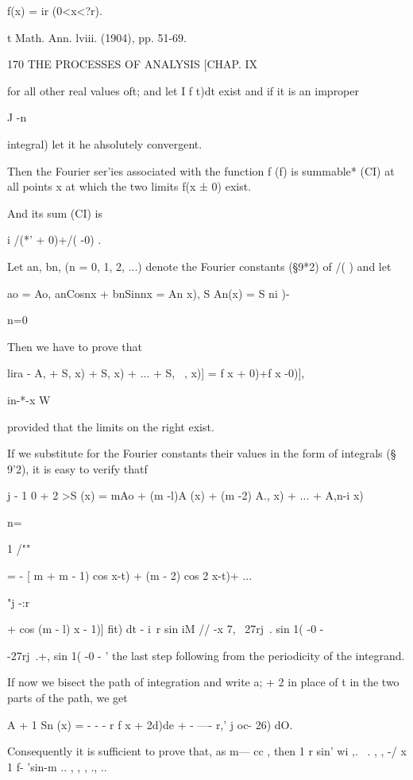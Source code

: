 f(x) = ir (0<x<?r).

t Math. Ann. lviii. (1904), pp. 51-69.



170 THE PROCESSES OF ANALYSIS [CHAP. IX



for all other real values oft; and let I f t)dt exist and if it is an
improper

J -n

integral) let it he ahsolutely convergent.

Then the Fourier ser'ies associated with the function f (f) is
summable* (CI) at all points x at which the two limits f(x ± 0) exist.

And its sum (CI) is

i /(*' + 0)+/( -0) .

Let an, bn, (n = 0, 1, 2, ...) denote the Fourier constants (§9*2) of
/( ) and let

 ao = Ao, anCosnx + bnSinnx = An x), S An(x) = S ni )-



n=0



Then we have to prove that



lira - A, + S, x) + S, x) + ... + S, \ , x)] = f x + 0)+f x -0)],

in-*-x W

provided that the limits on the right exist.

If we substitute for the Fourier constants their values in the form of
integrals (§ 9'2), it is easy to verify thatf

j - 1 0 + 2 >S (x) = mAo + (m -l)A (x) + (m -2) A., x) + ... + A,n-i
x)

n=\

1 /""

= - [ m + m - 1) cos x-t) + (m - 2) cos 2 x-t)+ ...

 "j -:r

+ cos (m - l) x - 1)] fit) dt - i\ r sin iM // -x 7, ~27rj\ . sin 1(
-0 -

-27rj\ .+, sin 1( -0 - ' the last step following from the periodicity
of the integrand.

If now we bisect the path of integration and write a; + 2 in place of
t in the two parts of the path, we get

A + 1 Sn (x) = - - - r f x + 2d)de + - —- r,' j oc- 26) dO.

Consequently it is sufficient to prove that, as m— cc , then 1 r sin'
wi ,. \ . , , -/ x 1 f- 'sin-m .. , , , ., ..



